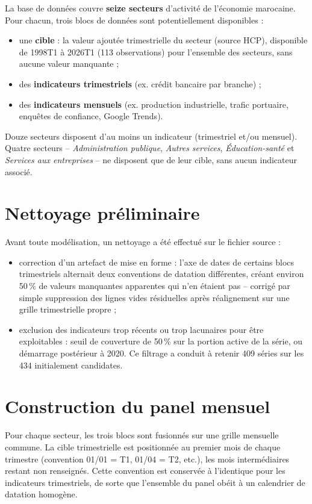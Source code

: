 \documentclass[11pt,a4paper]{report}
\begin{document}
La base de données couvre \textbf{seize secteurs} d'activité de l'économie marocaine. Pour chacun, trois blocs de données sont potentiellement disponibles :
\begin{itemize}[nosep]
  \item une \textbf{cible} : la valeur ajoutée trimestrielle du secteur (source HCP), disponible de \num{1998}T1 à \num{2026}T1 (113 observations) pour l'ensemble des secteurs, sans aucune valeur manquante ;
  \item des \textbf{indicateurs trimestriels} (ex. crédit bancaire par branche) ;
  \item des \textbf{indicateurs mensuels} (ex. production industrielle, trafic portuaire, enquêtes de confiance, Google Trends).
\end{itemize}

Douze secteurs disposent d'au moins un indicateur (trimestriel et/ou mensuel). Quatre secteurs -- \emph{Administration publique}, \emph{Autres services}, \emph{Éducation-santé} et \emph{Services aux entreprises} -- ne disposent que de leur cible, sans aucun indicateur associé.

\section{Nettoyage préliminaire}

Avant toute modélisation, un nettoyage a été effectué sur le fichier source :
\begin{itemize}[nosep]
  \item correction d'un artefact de mise en forme : l'axe de dates de certains blocs trimestriels alternait deux conventions de datation différentes, créant environ 50\,\% de valeurs manquantes apparentes qui n'en étaient pas -- corrigé par simple suppression des lignes vides résiduelles après réalignement sur une grille trimestrielle propre ;
  \item exclusion des indicateurs trop récents ou trop lacunaires pour être exploitables : seuil de couverture de 50\,\% sur la portion active de la série, ou démarrage postérieur à 2020. Ce filtrage a conduit à retenir 409 séries sur les 434 initialement candidates.
\end{itemize}

\section{Construction du panel mensuel}

Pour chaque secteur, les trois blocs sont fusionnés sur une grille mensuelle commune. La cible trimestrielle est positionnée au premier mois de chaque trimestre (convention \num{01}/\num{01} = T1, \num{01}/\num{04} = T2, etc.), les mois intermédiaires restant non renseignés. Cette convention est conservée à l'identique pour les indicateurs trimestriels, de sorte que l'ensemble du panel obéit à un calendrier de datation homogène.
\end{document}
